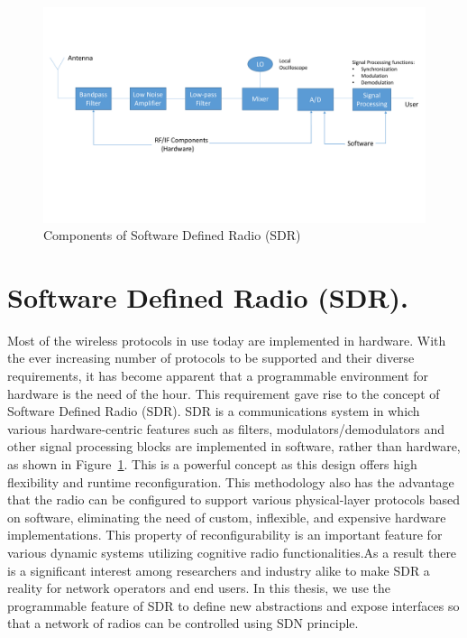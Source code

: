 \begin{figure}[t]
  \centering
  \includegraphics[width=1\textwidth]{figures/SDR.pdf}
  \caption{Components of Software Defined Radio (SDR)}
  \label{fig:SDR}
\end{figure}
\section{Software Defined Radio (SDR).}
Most of the wireless protocols in use today are implemented in hardware. With the ever increasing number of protocols to be supported and their diverse requirements, it has become apparent that a programmable environment for hardware is the need of the hour. This requirement gave rise to the concept of Software Defined Radio (SDR). SDR is a communications system in which various hardware-centric features such as filters, modulators/demodulators and other signal processing blocks are implemented in software, rather than hardware, as shown in Figure~\ref{fig:SDR}. This is a powerful concept as this design offers high flexibility and runtime reconfiguration. This methodology also has the advantage that the radio can be configured to support various physical-layer protocols based on software, eliminating the need of custom, inflexible, and expensive hardware implementations. This property of reconfigurability is an important feature for various dynamic systems utilizing cognitive radio functionalities.As a result there is a significant interest among researchers and industry alike to make SDR a reality for network operators and end users. In this thesis, we use the programmable feature of SDR to define new abstractions and expose interfaces so that a network of radios can be controlled using SDN principle. 

